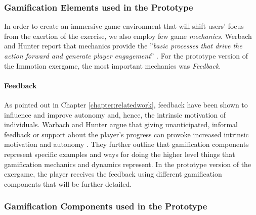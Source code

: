 \subsubsection{Gamification Elements used in the Prototype}
In order to create an immersive game environment that will shift users' focus from the exertion of the exercise, we also employ few game \textit{mechanics}.  Werbach and Hunter report that mechanics provide the ''\textit{basic processes that drive the action forward and generate
player engagement}'' \cite{werbach2012win}. For the prototype version of the Immotion exergame, the most important mechanics was \textit{Feedback}.
\paragraph{Feedback}
As pointed out in Chapter \ref{chapter:relatedwork}, feedback have been shown to influence and improve autonomy and, hence, the intrinsic motivation of individuals. %
Warbach and Hunter argue that giving unanticipated, informal feedback or support about the player's progress can provoke increased intrinsic motivation and autonomy \cite{werbach2012win}. They further outline that gamification components represent specific examples and ways for doing the higher level things that gamification mechanics and dynamics represent. In the prototype version of the exergame, the player receives the feedback using different gamification components that will be further detailed.
\subsubsection{Gamification Components used in the Prototype}
